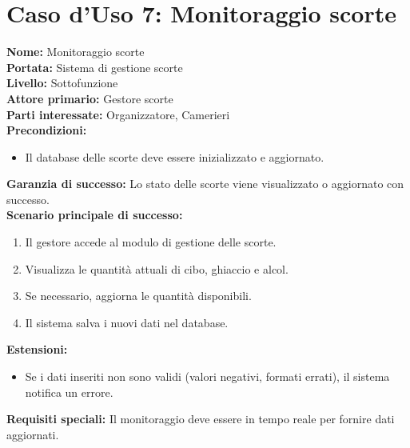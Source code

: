 \documentclass[a4paper,12pt]{article}
\begin{document}
{\section*{\textcolor{sectioncolor}{Caso d'Uso 7: Monitoraggio scorte}}
\textcolor{textcolor}{
\textbf{Nome:} Monitoraggio scorte\\
\textbf{Portata:} Sistema di gestione scorte\\
\textbf{Livello:} Sottofunzione\\
\textbf{Attore primario:} Gestore scorte\\
\textbf{Parti interessate:} Organizzatore, Camerieri\\
\textbf{Precondizioni:}
\begin{itemize}
    \item Il database delle scorte deve essere inizializzato e aggiornato.
\end{itemize}
\textbf{Garanzia di successo:} Lo stato delle scorte viene visualizzato o aggiornato con successo.\\
\textbf{Scenario principale di successo:}
\begin{enumerate}
    \item Il gestore accede al modulo di gestione delle scorte.
    \item Visualizza le quantità attuali di cibo, ghiaccio e alcol.
    \item Se necessario, aggiorna le quantità disponibili.
    \item Il sistema salva i nuovi dati nel database.
\end{enumerate}
\textbf{Estensioni:}
\begin{itemize}
    \item  Se i dati inseriti non sono validi (valori negativi, formati errati), il sistema notifica un errore.
\end{itemize}
\textbf{Requisiti speciali:} Il monitoraggio deve essere in tempo reale per fornire dati aggiornati.
}

}
\end{document}
